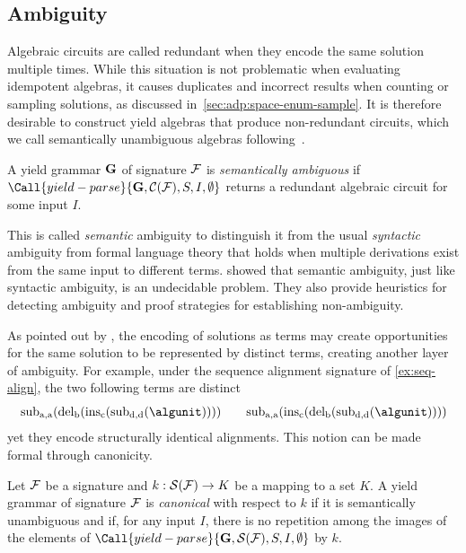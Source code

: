 \subsection{Ambiguity}

Algebraic circuits are called redundant when they encode the same solution multiple times.
While this situation is not problematic when evaluating idempotent algebras, it causes duplicates  and incorrect results when counting or sampling solutions, as discussed in~\cref{sec:adp:space-enum-sample}.
It is therefore desirable to construct yield algebras that produce non-redundant circuits, which we call semantically unambiguous algebras following~\textcite{Reeder2005EffectiveAmbiguityChecking}.

\begin{definition}
    A yield grammar \(\gram\) of signature \(\algsign\) is \emph{semantically ambiguous}
    if \(\Call{yield-parse}{\gram, \altrace(\algsign), S, I, \emptyset}\)
    returns a redundant algebraic circuit for some input \(I\).
\end{definition}

This is called \emph{semantic} ambiguity to distinguish it from the usual \emph{syntactic} ambiguity from formal language theory that holds when multiple derivations exist from the same input to different terms.
\textcite{Reeder2005EffectiveAmbiguityChecking} showed that semantic ambiguity, just like syntactic ambiguity, is an undecidable problem.
They also provide heuristics for detecting ambiguity and proof strategies for establishing non-ambiguity.

As pointed out by \textcite{Giegerich2000ExplainingControllingAmbiguity}, the encoding of solutions as terms may create opportunities for the same solution to be represented by distinct terms, creating another layer of ambiguity.
For example, under the sequence alignment signature of \cref{ex:seq-align}, the two following terms are distinct \[
    \algsym{sub}_{\text{a},\text{a}}(\algsym{del}_\text{b}(\algsym{ins}_\text{c}(\algsym{sub}_{\text{d},\text{d}}(\algunit))))
    \qquad \algsym{sub}_{\text{a},\text{a}}(\algsym{ins}_\text{c}(\algsym{del}_\text{b}(\algsym{sub}_{\text{d},\text{d}}(\algunit))))
\]
yet they encode structurally identical alignments.
This notion can be made formal through canonicity.

\begin{definition}
    Let \(\algsign\) be a signature and \(k : \alterm(\algsign) \rightarrow K\) be a mapping to a set \(K\).
    A yield grammar of signature \(\algsign\) is \emph{canonical} with respect to \(k\) if it is semantically unambiguous and if, for any input \(I\), there is no repetition among the images of the elements of \(\Call{yield-parse}{\gram, \alterm(\algsign), S, I, \emptyset}\) by \(k\).
\end{definition}

